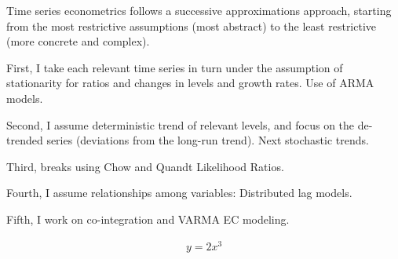 \documentclass[pt=12]{article}
\begin{document}
Time series econometrics follows a successive approximations approach, starting from the most restrictive assumptions (most abstract) to the least restrictive (more concrete and complex).  

First, I take each relevant time series in turn under the assumption of stationarity for ratios and changes in levels and growth rates.  Use of ARMA models.

Second, I assume deterministic trend of relevant levels, and focus on the de-trended series (deviations from the long-run trend). Next stochastic trends.

Third, breaks using Chow and Quandt Likelihood Ratios.

Fourth, I assume relationships among variables: Distributed lag models. 

Fifth, I work on co-integration and VARMA EC modeling.

\begin{eqnarray}
y = 2 x^3
\end{eqnarray}
\end{document}
